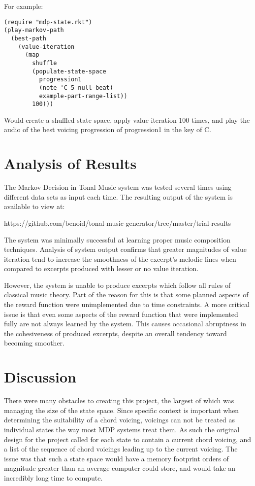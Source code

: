 \documentclass{chi2009}
\begin{document}
For example:

\begin{lstlisting}[language=LISP]
(require "mdp-state.rkt")
(play-markov-path 
  (best-path  
    (value-iteration 
      (map
        shuffle 
        (populate-state-space 
          progression1
          (note 'C 5 null-beat)
          example-part-range-list))               
        100)))       
\end{lstlisting}   
     
Would create a shuffled state space, apply value iteration 100 times, and play the audio of the best voicing progression of progression1 in the key of C.  




\section{Analysis of Results}

The Markov Decision in Tonal Music system was tested several times using different data sets as input each time.  The resulting output of the system is available to view at:

https://github.com/benoid/tonal-music-generator/tree/master/trial-results

The system was minimally successful at learning proper music composition techniques.   Analysis of system output confirms that greater magnitudes of value iteration tend to increase the smoothness of the excerpt's melodic lines when compared to excerpts produced with lesser or no value iteration.  

However, the system is unable to produce excerpts which follow all rules of classical music theory.  Part of the reason for this is that some planned aspects of the reward function were unimplemented due to time constraints.  A more critical issue is that even some aspects of the reward function that were implemented fully are not always learned by the system.  This causes occasional abruptness in the cohesiveness of produced excerpts, despite an overall tendency toward becoming smoother.

\section{Discussion}
There were many obstacles to creating this project, the largest of which was managing the size of the state space.  Since specific context is important when determining the suitability of a chord voicing, voicings can not be treated as individual states the way most MDP systems treat them. As such the original design for the project called for each state to contain a current chord voicing, and a list of the sequence of chord voicings leading up to the current voicing.  The issue was that such a state space would have a memory footprint orders of magnitude greater than an average computer could store, and would take an incredibly long time to compute.  
\end{document}
